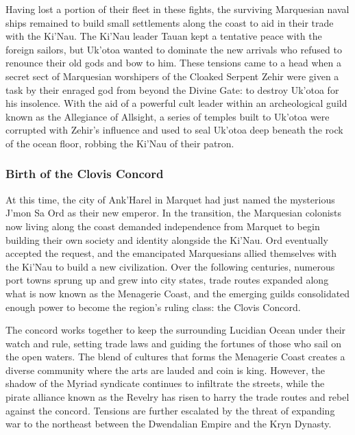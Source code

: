 \documentclass[10pt,a4paper,twoside,bg=print,twocolumn,openany,nodeprecatedcode]{dndbook}
\begin{document}
Having lost a portion of their fleet in these fights, the surviving Marquesian naval ships remained to build small settlements along the coast to aid in their trade with the Ki'Nau. The Ki'Nau leader Tauan kept a tentative peace with the foreign sailors, but Uk'otoa wanted to dominate the new arrivals who refused to renounce their old gods and bow to him. These tensions came to a head when a secret sect of Marquesian worshipers of the Cloaked Serpent Zehir were given a task by their enraged god from beyond the Divine Gate: to destroy Uk'otoa for his insolence. With the aid of a powerful cult leader within an archeological guild known as the Allegiance of Allsight, a series of temples built to Uk'otoa were corrupted with Zehir's influence and used to seal Uk'otoa deep beneath the rock of the ocean floor, robbing the Ki'Nau of their patron.

\subsubsection{Birth of the Clovis Concord}
At this time, the city of Ank'Harel in Marquet had just named the mysterious J'mon Sa Ord as their new emperor. In the transition, the Marquesian colonists now living along the coast demanded independence from Marquet to begin building their own society and identity alongside the Ki'Nau. Ord eventually accepted the request, and the emancipated Marquesians allied themselves with the Ki'Nau to build a new civilization. Over the following centuries, numerous port towns sprung up and grew into city states, trade routes expanded along what is now known as the Menagerie Coast, and the emerging guilds consolidated enough power to become the region's ruling class: the Clovis Concord.

The concord works together to keep the surrounding Lucidian Ocean under their watch and rule, setting trade laws and guiding the fortunes of those who sail on the open waters. The blend of cultures that forms the Menagerie Coast creates a diverse community where the arts are lauded and coin is king. However, the shadow of the Myriad syndicate continues to infiltrate the streets, while the pirate alliance known as the Revelry has risen to harry the trade routes and rebel against the concord. Tensions are further escalated by the threat of expanding war to the northeast between the Dwendalian Empire and the Kryn Dynasty.
\end{document}
